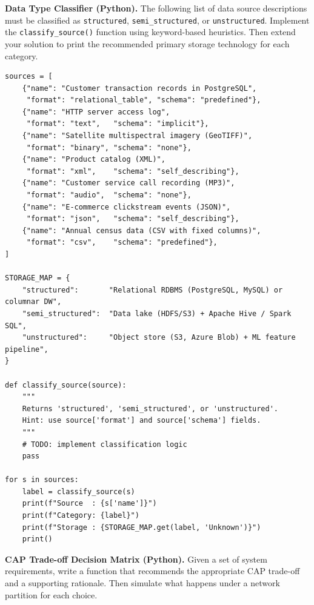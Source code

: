 \bigskip
{}

\pe \textbf{Data Type Classifier (Python).}
The following list of data source descriptions must be classified as
\texttt{structured}, \texttt{semi\_structured}, or \texttt{unstructured}.
Implement the \texttt{classify\_source()} function using keyword-based
heuristics. Then extend your solution to print the recommended primary
storage technology for each category.

\begin{lstlisting}[style=pyspark, caption={PE1.1: Data type classifier}]
sources = [
    {"name": "Customer transaction records in PostgreSQL",
     "format": "relational_table", "schema": "predefined"},
    {"name": "HTTP server access log",
     "format": "text",   "schema": "implicit"},
    {"name": "Satellite multispectral imagery (GeoTIFF)",
     "format": "binary", "schema": "none"},
    {"name": "Product catalog (XML)",
     "format": "xml",    "schema": "self_describing"},
    {"name": "Customer service call recording (MP3)",
     "format": "audio",  "schema": "none"},
    {"name": "E-commerce clickstream events (JSON)",
     "format": "json",   "schema": "self_describing"},
    {"name": "Annual census data (CSV with fixed columns)",
     "format": "csv",    "schema": "predefined"},
]

STORAGE_MAP = {
    "structured":       "Relational RDBMS (PostgreSQL, MySQL) or columnar DW",
    "semi_structured":  "Data lake (HDFS/S3) + Apache Hive / Spark SQL",
    "unstructured":     "Object store (S3, Azure Blob) + ML feature pipeline",
}

def classify_source(source):
    """
    Returns 'structured', 'semi_structured', or 'unstructured'.
    Hint: use source['format'] and source['schema'] fields.
    """
    # TODO: implement classification logic
    pass

for s in sources:
    label = classify_source(s)
    print(f"Source  : {s['name']}")
    print(f"Category: {label}")
    print(f"Storage : {STORAGE_MAP.get(label, 'Unknown')}")
    print()
\end{lstlisting}

\pe \textbf{CAP Trade-off Decision Matrix (Python).}
Given a set of system requirements, write a function that recommends the
appropriate CAP trade-off and a supporting rationale. Then simulate what
happens under a network partition for each choice.

